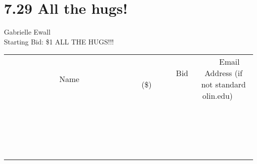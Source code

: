 \documentclass[11pt]{article}
\begin{document}
\section*{7.29 All the hugs!}
Gabrielle Ewall
\\
Starting Bid: \$1
\newline
ALL THE HUGS!!!
\\[3ex]
\begin{tabular}{c c c}
~~~~~~~~~~~~~Name~~~~~~~~~~~~~ & ~~~~~~~~~Bid (\$)~~~~~~~~~  & ~~~Email Address (if not standard olin.edu)~~~\\
 & & \\
\hline
 & & \\
\hline
 & & \\
\hline
 & & \\
\hline
 & & \\
\hline
 & & \\
\hline
 & & \\
\hline
 & & \\
\hline
 & & \\
\hline
 & & \\
\hline
 & & \\
\hline
 & & \\
\hline
 & & \\
\hline
 & & \\
\hline
 & & \\
\hline
 & & \\
\hline
 & & \\
\hline
 & & \\
\hline
 & & \\
\hline
\end{tabular}
\newpage
\end{document}
